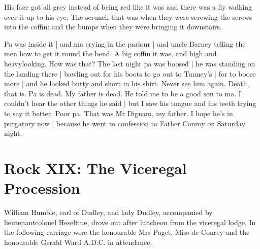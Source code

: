 His face got all grey
instead of being red like it was
and there was a
fly walking over it
up to his eye.
The scrunch that was
when they were
screwing the screws into the coffin:
and the bumps when they were bringing
it downstairs.

Pa was inside it |
and ma crying in the parlour |
and uncle Barney telling the men
how to get it round the bend.
A big coffin it was,
and high and heavylooking.
How was that?
The last night pa was boosed |
he was standing on the landing there |
bawling out for his boots to go out to Tunney's |
for to boose more |
and he looked butty and short in his shirt.
Never see him again.
Death, that is.
Pa is dead.
My father is dead.
He told me to be a good son to ma.
I couldn't hear the other things he said |
but I saw his tongue and his teeth trying to say it better.
Poor pa.
That was Mr Dignam, my father.
I hope he's in purgatory now |
because he went to confession to Father Conroy on Saturday night.


\section*{Rock XIX: The Viceregal Procession}


William Humble,
earl of Dudley,
and lady Dudley,
accompanied by
lieutenantcolonel Heseltine,
drove out after luncheon
from the viceregal
lodge.
In the following carriage
were the honourable Mrs Paget,
Miss de
Courcy
and the honourable Gerald Ward A.D.C.
in attendance.

